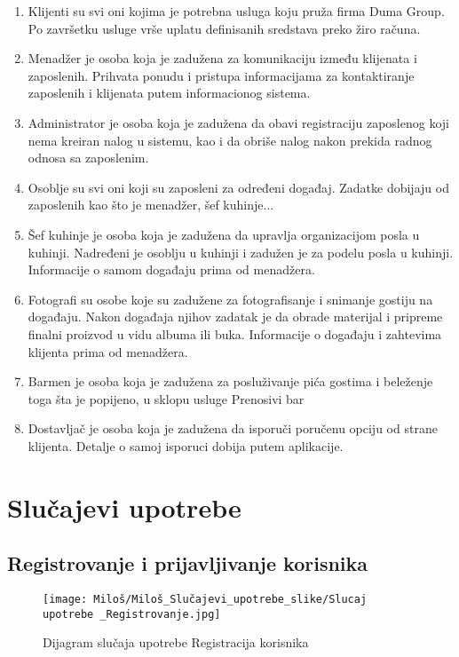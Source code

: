 \documentclass[a4paper]{article}
\begin{document}
    \begin{enumerate}
        \item Klijenti su svi oni kojima je potrebna usluga koju pruža firma Duma Group. Po završetku usluge vrše uplatu definisanih sredstava preko žiro računa.
        \item Menadžer je osoba koja je zadužena za komunikaciju između klijenata i zaposlenih. Prihvata ponudu i pristupa informacijama za kontaktiranje zaposlenih i klijenata putem informacionog sistema.
        \item Administrator je osoba koja je zadužena da obavi registraciju zaposlenog koji nema kreiran nalog u sistemu, kao i da obriše nalog nakon prekida radnog odnosa sa zaposlenim.
        \item Osoblje su svi oni koji su zaposleni za određeni događaj. Zadatke dobijaju od zaposlenih kao što je menadžer, šef kuhinje...
        \item Šef kuhinje je osoba koja je zadužena da upravlja organizacijom posla u kuhinji. Nadređeni je osoblju u kuhinji i zadužen je za podelu posla u kuhinji. Informacije o samom događaju prima od menadžera.
        \item Fotografi su osobe koje su zadužene za fotografisanje i snimanje gostiju na događaju. Nakon događaja njihov zadatak je da obrade materijal i pripreme finalni proizvod u vidu albuma ili buka. Informacije o događaju i zahtevima klijenta prima od menadžera.
        \item Barmen je osoba koja je zadužena za posluživanje pića gostima i beleženje toga šta je popijeno, u sklopu usluge Prenosivi bar
        \item Dostavljač je osoba koja je zadužena da isporuči poručenu opciju od strane klijenta. Detalje o samoj isporuci dobija putem aplikacije.
    \end{enumerate}
    
    
\section{Slučajevi upotrebe}


\subsection{Registrovanje i prijavljivanje korisnika}

\begin{figure}[htp]
    \centering
    \texttt{[image: Miloš/Miloš\_Slučajevi\_upotrebe\_slike/Slucaj upotrebe \_Registrovanje.jpg]}
    \caption{Dijagram slučaja upotrebe Registracija korisnika}
    \label{fig:Registracija}
\end{figure}
\end{document}
